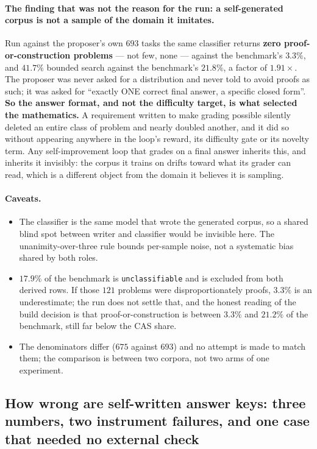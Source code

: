 \paragraph{The finding that was not the reason for the run: a self-generated corpus is not a
sample of the domain it imitates.} Run against the proposer's own $693$ tasks the same
classifier returns \textbf{zero proof-or-construction problems} --- not few, none --- against
the benchmark's $3.3\%$, and $41.7\%$ bounded search against the benchmark's $21.8\%$, a factor
of $\mathbf{1.91\times}$. The proposer was never asked for a distribution and never told to
avoid proofs as such; it was asked for ``exactly ONE correct final answer, a specific closed
form''. \textbf{So the answer format, and not the difficulty target, is what selected the
mathematics.} A requirement written to make grading possible silently deleted an entire class
of problem and nearly doubled another, and it did so without appearing anywhere in the loop's
reward, its difficulty gate or its novelty term. Any self-improvement loop that grades on a
final answer inherits this, and inherits it invisibly: the corpus it trains on drifts toward
what its grader can read, which is a different object from the domain it believes it is
sampling.

\paragraph{Caveats.}
\begin{itemize}
\item The classifier is the same model that wrote the generated corpus, so a shared blind spot
between writer and classifier would be invisible here. The unanimity-over-three rule bounds
per-sample noise, not a systematic bias shared by both roles.
\item $17.9\%$ of the benchmark is \texttt{unclassifiable} and is excluded from both derived
rows. If those $121$ problems were disproportionately proofs, $3.3\%$ is an underestimate;
the run does not settle that, and the honest reading of the build decision is that
proof-or-construction is between $3.3\%$ and $21.2\%$ of the benchmark, still far below the
CAS share.
\item The denominators differ ($675$ against $693$) and no attempt is made to match them; the
comparison is between two corpora, not two arms of one experiment.
\end{itemize}

\subsection{How wrong are self-written answer keys: three numbers, two instrument failures,
and one case that needed no external check}
\label{sec:keyquality}

